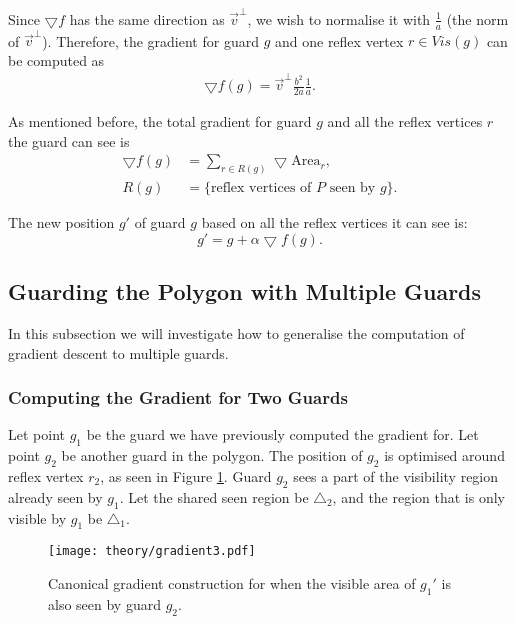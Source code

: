 Since $\bigtriangledown f$ has the same direction as $\vec v^\perp$, we wish to normalise it with $\frac 1 a$ (the norm of $\vec v^\perp$). Therefore, the gradient for guard $g$ and one reflex vertex $r \in \mathit{Vis}(g)$ can be computed as 
\begin{align}
    \bigtriangledown f(g) = \vec v^\perp \frac{b^2}{2a} \frac 1 a. \label{eq:f}
\end{align}

As mentioned before, the total gradient for guard $g$ and all the reflex vertices $r$ the guard can see is 
\begin{align*}
    \bigtriangledown f(g) &= \sum_{r \in R(g)} \bigtriangledown \text{Area}_r, \\
    R(g) &= \{\text{reflex vertices of } P \text{ seen by }g\}.
\end{align*}

The new position $g'$ of guard $g$ based on all the reflex vertices it can see is: 
\begin{equation}
    g' = g + \alpha\bigtriangledown f(g).
    \label{eq:l}
\end{equation}

\subsection{Guarding the Polygon with Multiple Guards}
In this subsection we will investigate how to generalise the computation of gradient descent to multiple guards.

\subsubsection{Computing the Gradient for Two Guards}
Let point $g_1$ be the guard we have previously computed the gradient for. Let point $g_2$ be another guard in the polygon. The position of $g_2$ is optimised around reflex vertex $r_2$, as seen in Figure \ref{fig:poly_gradient}. Guard $g_2$ sees a part of the visibility region already seen by $g_1$. Let the shared seen region be $\triangle_2$, and the region that is only visible by $g_1$ be $\triangle_1$.

\begin{figure}[h!]
    \centering
    \texttt{[image: theory/gradient3.pdf]}
    \caption{Canonical gradient construction for when the visible area of $g_1'$ is also seen by guard $g_2$.}
    \label{fig:poly_gradient}
\end{figure}


